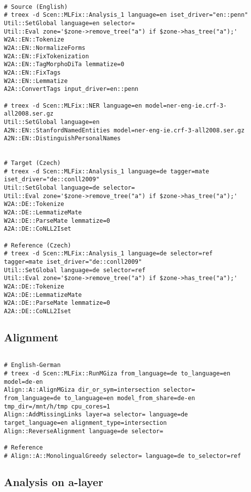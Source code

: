 \begin{lstlisting}

# Source (English)
# treex -d Scen::MLFix::Analysis_1 language=en iset_driver="en::penn"
Util::SetGlobal language=en selector=
Util::Eval zone='$zone->remove_tree("a") if $zone->has_tree("a");'
W2A::EN::Tokenize
W2A::EN::NormalizeForms
W2A::EN::FixTokenization
W2A::EN::TagMorphoDiTa lemmatize=0
W2A::EN::FixTags
W2A::EN::Lemmatize
A2A::ConvertTags input_driver=en::penn

# treex -d Scen::MLFix::NER language=en model=ner-eng-ie.crf-3-all2008.ser.gz
Util::SetGlobal language=en
A2N::EN::StanfordNamedEntities model=ner-eng-ie.crf-3-all2008.ser.gz
A2N::EN::DistinguishPersonalNames


# Target (Czech)
# treex -d Scen::MLFix::Analysis_1 language=de tagger=mate iset_driver="de::conll2009"
Util::SetGlobal language=de selector=
Util::Eval zone='$zone->remove_tree("a") if $zone->has_tree("a");'
W2A::DE::Tokenize
W2A::DE::LemmatizeMate
W2A::DE::ParseMate lemmatize=0
A2A::DE::CoNLL2Iset

# Reference (Czech)
# treex -d Scen::MLFix::Analysis_1 language=de selector=ref tagger=mate iset_driver="de::conll2009"
Util::SetGlobal language=de selector=ref
Util::Eval zone='$zone->remove_tree("a") if $zone->has_tree("a");'
W2A::DE::Tokenize
W2A::DE::LemmatizeMate
W2A::DE::ParseMate lemmatize=0
A2A::DE::CoNLL2Iset

\end{lstlisting}

\subsection{Alignment}

\begin{lstlisting}

# English-German
# treex -d Scen::MLFix::RunMGiza from_language=de to_language=en model=de-en
Align::A::AlignMGiza dir_or_sym=intersection selector= from_language=de to_language=en model_from_share=de-en tmp_dir=/mnt/h/tmp cpu_cores=1
Align::AddMissingLinks layer=a selector= language=de target_language=en alignment_type=intersection
Align::ReverseAlignment language=de selector=

# Reference
# Align::A::MonolingualGreedy selector= language=de to_selector=ref

\end{lstlisting}

\subsection{Analysis on a-layer}

